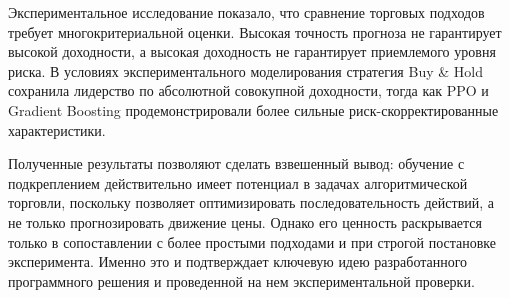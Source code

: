 Экспериментальное исследование показало, что сравнение торговых подходов требует многокритериальной оценки. Высокая точность прогноза не гарантирует высокой доходности, а высокая доходность не гарантирует приемлемого уровня риска. В условиях экспериментального моделирования стратегия Buy \& Hold сохранила лидерство по абсолютной совокупной доходности, тогда как PPO и Gradient Boosting продемонстрировали более сильные риск-скорректированные характеристики.

Полученные результаты позволяют сделать взвешенный вывод: обучение с подкреплением действительно имеет потенциал в задачах алгоритмической торговли, поскольку позволяет оптимизировать последовательность действий, а не только прогнозировать движение цены. Однако его ценность раскрывается только в сопоставлении с более простыми подходами и при строгой постановке эксперимента. Именно это и подтверждает ключевую идею разработанного программного решения и проведенной на нем экспериментальной проверки.
